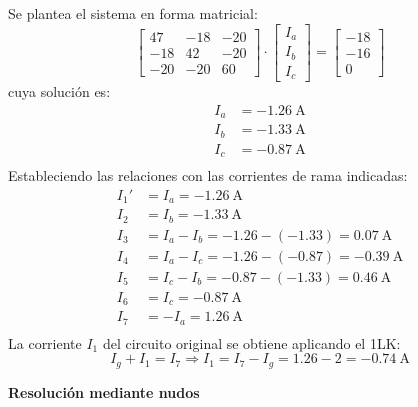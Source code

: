      Se plantea el sistema en forma matricial:
     \begin{equation*}
       \begin{bmatrix}
         47 & -18 & -20\\
         -18 & 42 & -20\\
         -20 & -20 & 60
       \end{bmatrix}
       \cdot
       \begin{bmatrix}
         I_a\\
         I_b\\
         I_c
       \end{bmatrix}
       =
       \begin{bmatrix}
         -18\\
         -16\\
         0
       \end{bmatrix}
     \end{equation*}
     cuya solución es:
     \begin{align*}
       I_a&=\qty{-1.26}{\ampere}\\
       I_b&=\qty{-1.33}{\ampere}\\
       I_c&=\qty{-0.87}{\ampere}\\
     \end{align*}
     Estableciendo las relaciones con las corrientes de rama
     indicadas:
     \begin{align*}
       I_1'&=I_a=\qty{-1.26}{\ampere}\\
       I_2&=I_b=\qty{-1.33}{\ampere}\\
       I_3&=I_a-I_b=-1.26-(-1.33)=\qty{0.07}{\ampere}\\
       I_4&=I_a-I_c=-1.26-(-0.87)=\qty{-0.39}{\ampere}\\
       I_5&=I_c-I_b=-0.87-(-1.33)=\qty{0.46}{\ampere}\\
       I_6&=I_c=\qty{-0.87}{\ampere}\\
       I_7&=-I_a=\qty{1.26}{\ampere}\\
     \end{align*}
     La corriente $I_1$ del circuito original se obtiene aplicando el
     1LK:
     \begin{equation*}
       I_g+I_1=I_7\Rightarrow I_1=I_7-I_g=1.26-2=\qty{-0.74}{\ampere}
     \end{equation*}

     \textbf{Resolución mediante nudos}

